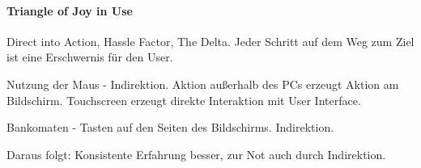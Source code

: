 \paragraph{Triangle of Joy in Use}

Direct into Action, Hassle Factor, The Delta. Jeder Schritt auf dem Weg zum Ziel
ist eine Erschwernis für den User.

Nutzung der Maus - Indirektion. Aktion außerhalb des PCs erzeugt Aktion am Bildschirm.
Touchscreen erzeugt direkte Interaktion mit User Interface.

Bankomaten - Tasten auf den Seiten des Bildschirms. Indirektion. 

\noindent{}

Daraus folgt: Konsistente Erfahrung besser, zur Not auch durch Indirektion.

